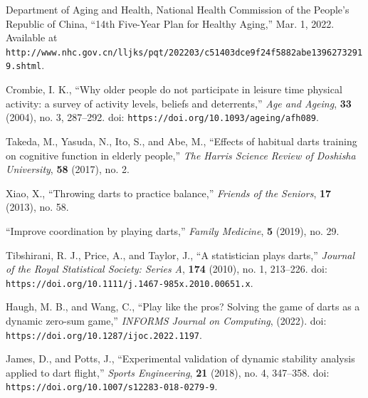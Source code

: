 \documentclass[cjjs]{ipart}
\theoremstyle{plain}
\begin{document}
\begin{thebibliography}{9}

Department of Aging and Health, National Health Commission of the People's Republic of China, ``14th Five-Year Plan for Healthy Aging,'' Mar. 1, 2022. Available at \texttt{http://www.nhc.gov.cn/lljks/pqt/202203\break /c51403dce9f24f5882abe13962732919.shtml}.

Crombie, I. K., ``Why older people do not participate in leisure time physical activity: a survey of activity levels, beliefs and deterrents,'' \textit{Age and Ageing}, \textbf{33} (2004), no. 3, 287--292. doi: \texttt{https://doi.org/10.1093/ageing/afh089}.

Takeda, M., Yasuda, N., Ito, S., and Abe, M., ``Effects of habitual darts training on cognitive function in elderly people,'' \textit{The Harris Science Review of Doshisha University}, \textbf{58} (2017), no. 2.

Xiao, X., ``Throwing darts to practice balance,'' \textit{Friends of the Seniors}, \textbf{17} (2013), no. 58.

``Improve coordination by playing darts,'' \textit{Family Medicine}, \textbf{5} (2019), no. 29.

Tibshirani, R. J., Price, A., and Taylor, J., ``A statistician plays darts,'' \textit{Journal of the Royal Statistical Society: Series A}, \textbf{174} (2010), no. 1, 213--226. doi: \texttt{https://doi.org/10.1111/j.1467-985x.2010.00651.x}.

Haugh, M. B., and Wang, C., ``Play like the pros? Solving the game of darts as a dynamic zero-sum game,'' \textit{INFORMS Journal on Computing}, (2022). doi: \texttt{https://doi.org/10.1287/ijoc.2022.1197}.

James, D., and Potts, J., ``Experimental validation of dynamic stability analysis applied to dart flight,'' \textit{Sports Engineering}, \textbf{21} (2018), no. 4, 347--358. doi: \texttt{https://doi.org/10.1007/s12283-018-0279-9}.

\end{thebibliography}
\end{document}
